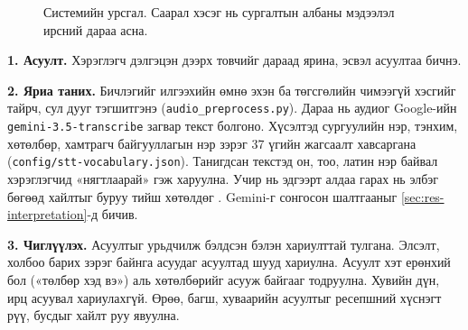 \begin{figure}[H]
\centering
{}
\caption{Системийн урсгал. Саарал хэсэг нь сургалтын албаны мэдээлэл ирсний дараа асна.}
\label{fig:system_flow}
\end{figure}

\textbf{1. Асуулт.} Хэрэглэгч дэлгэцэн дээрх товчийг дараад ярина, эсвэл асуултаа бичнэ.

\textbf{2. Яриа таних.} Бичлэгийг илгээхийн өмнө эхэн ба төгсгөлийн чимээгүй хэсгийг тайрч, сул дууг тэгшитгэнэ (\texttt{audio\_preprocess.py}). Дараа нь аудиог Google-ийн \texttt{gemini-3.5-transcribe} загвар текст болгоно. Хүсэлтэд сургуулийн нэр, тэнхим, хөтөлбөр, хамтрагч байгууллагын нэр зэрэг 37 үгийн жагсаалт хавсаргана (\texttt{config/\allowbreak stt-vocabulary.json}). Танигдсан текстэд он, тоо, латин нэр байвал хэрэглэгчид «нягтлаарай» гэж харуулна. Учир нь эдгээрт алдаа гарах нь элбэг бөгөөд хайлтыг буруу тийш хөтөлдөг \cite{sidiropoulos2022asr}. Gemini-г сонгосон шалтгааныг \ref{sec:res-interpretation}-д бичив.

\textbf{3. Чиглүүлэх.} Асуултыг урьдчилж бэлдсэн бэлэн хариулттай тулгана. Элсэлт, холбоо барих зэрэг байнга асуудаг асуултад шууд хариулна. Асуулт хэт ерөнхий бол («төлбөр хэд вэ») аль хөтөлбөрийг асууж байгааг тодруулна. Хувийн дүн, ирц асуувал хариулахгүй. Өрөө, багш, хуваарийн асуултыг ресепшний хүснэгт рүү, бусдыг хайлт руу явуулна.

